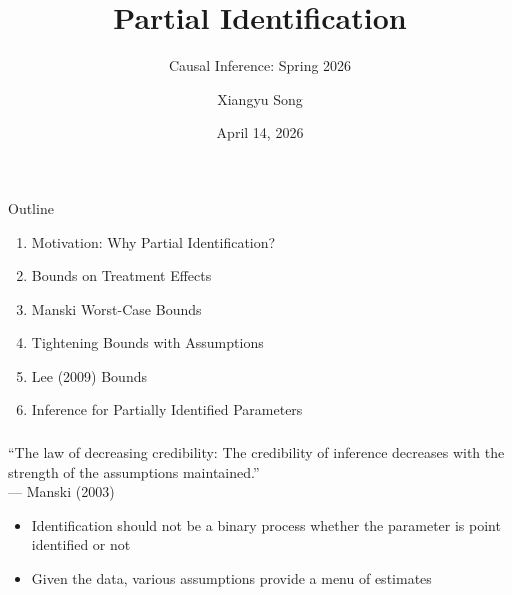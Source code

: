 \documentclass[10pt]{beamer}
\title[Partial Identification]{Partial Identification}
\subtitle{Causal Inference: Spring 2026}
\author[Song]{Xiangyu Song}
\institute{Washington University in St. Louis}
\date{April 14, 2026}
\begin{document}
\maketitle


\begin{frame}{Outline}
  \begin{enumerate}
    \item Motivation: Why Partial Identification?
    \vspace{0.3cm}
    \item Bounds on Treatment Effects
    \vspace{0.3cm}
    \item Manski Worst-Case Bounds
    \vspace{0.3cm}
    \item Tightening Bounds with Assumptions
    \vspace{0.3cm}
    \item Lee (2009) Bounds
    \vspace{0.3cm}
    \item Inference for Partially Identified Parameters

  \end{enumerate}
\end{frame}


\begin{frame}
  \frametitle{}
  
  \begin{block}{}
    ``The law of decreasing credibility: The credibility of inference decreases with the strength of the assumptions maintained.''\\
    \hfill --- Manski (2003)
  \end{block}
  \begin{itemize}
    \item Identification should not be a binary process whether the parameter is point identified or not
      \item Given the data, various assumptions provide a menu of estimates
  \end{itemize}
\end{frame}
\end{document}
